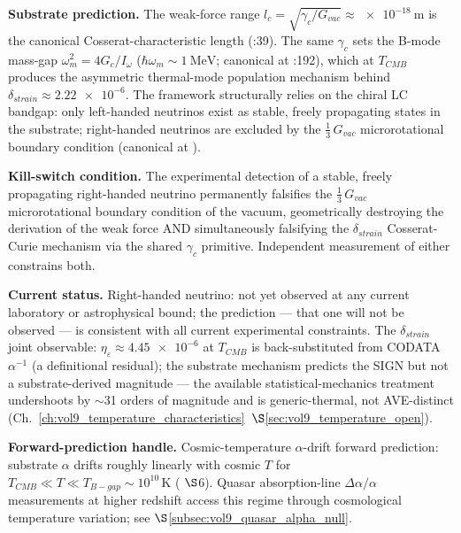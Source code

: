 \textbf{Substrate prediction.} The weak-force range $l_c = \sqrt{\gamma_c/G_{vac}} \approx \qty{e-18}{\metre}$ is the canonical Cosserat-characteristic length (:39). The same $\gamma_c$ sets the B-mode mass-gap $\omega_m^2 = 4 G_c/I_\omega$ ($\hbar\omega_m \sim \qty{1}{\mega\electronvolt}$; canonical at :192), which at $T_{CMB}$ produces the asymmetric thermal-mode population mechanism behind $\delta_{strain} \approx \num{2.22e-6}$. The framework structurally relies on the chiral LC bandgap: only left-handed neutrinos exist as stable, freely propagating states in the substrate; right-handed neutrinos are excluded by the $\tfrac{1}{3}\,G_{vac}$ microrotational boundary condition (canonical at ).

\textbf{Kill-switch condition.} The experimental detection of a stable, freely propagating right-handed neutrino permanently falsifies the $\tfrac{1}{3}\,G_{vac}$ microrotational boundary condition of the vacuum, geometrically destroying the derivation of the weak force AND simultaneously falsifying the $\delta_{strain}$ Cosserat-Curie mechanism via the shared $\gamma_c$ primitive. Independent measurement of either constrains both.

\textbf{Current status.} Right-handed neutrino: not yet observed at any current laboratory or astrophysical bound; the prediction --- that one will not be observed --- is consistent with all current experimental constraints. The $\delta_{strain}$ joint observable: $\eta_\varepsilon \approx \num{4.45e-6}$ at $T_{CMB}$ is back-substituted from CODATA $\alpha^{-1}$ (a definitional residual); the substrate mechanism predicts the SIGN but not a substrate-derived magnitude --- the available statistical-mechanics treatment undershoots by $\sim$31 orders of magnitude and is generic-thermal, not AVE-distinct (Ch.~\ref{ch:vol9_temperature_characteristics}~$\S$\ref{sec:vol9_temperature_open}).

\textbf{Forward-prediction handle.} Cosmic-temperature $\alpha$-drift forward prediction: substrate $\alpha$ drifts roughly linearly with cosmic $T$ for $T_{CMB} \ll T \ll T_{B-gap} \sim 10^{10}\,\text{K}$ ( $\S$6). Quasar absorption-line $\Delta\alpha/\alpha$ measurements at higher redshift access this regime through cosmological temperature variation; see $\S$\ref{subsec:vol9_quasar_alpha_null}.

